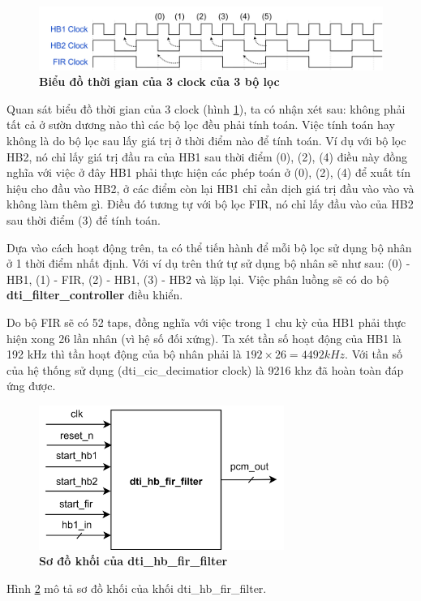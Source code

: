 \begin{figure}[H]
    \centering
    \includegraphics[width=16cm]{Images/Chuong4/hb_fir/timing.png}
    \caption[Biểu đồ thời gian của 3 clock của 3 bộ lọc]{\bfseries \fontsize{12pt}{0pt}\selectfont Biểu đồ thời gian của 3 clock của 3 bộ lọc}
    \label{3clock}
\end{figure}

Quan sát biểu đồ thời gian của 3 clock (hình \ref{3clock}), ta có nhận xét sau: không phải tất cả ở sườn dương nào thì các bộ lọc đều phải tính toán. Việc tính toán hay không là do bộ lọc sau lấy giá trị ở thời điểm nào để tính toán. Ví dụ với bộ lọc HB2, nó chỉ lấy giá trị đầu ra của HB1 sau thời điểm (0), (2), (4) điều này đồng nghĩa với việc ở đây HB1 phải thực hiện các phép toán ở (0), (2), (4) để xuất tín hiệu cho đầu vào HB2, ở các điểm còn lại HB1 chỉ cần dịch giá trị đầu vào vào và không làm thêm gì. Điều đó tương tự với bộ lọc FIR, nó chỉ lấy đầu vào của HB2  sau thời điểm (3) để tính toán.

Dựa vào cách hoạt động trên, ta có thể tiến hành để mỗi bộ lọc sử dụng bộ nhân ở 1 thời điểm nhất định. Với ví dụ trên thứ tự sử dụng bộ nhân sẽ như sau: (0) - HB1, (1) - FIR, (2) - HB1, (3) - HB2 và lặp lại. Việc phân luồng sẽ có do bộ \textbf{dti\_filter\_controller} điều khiển.

Do bộ FIR sẽ có 52 taps, đồng nghĩa với việc trong 1 chu kỳ của HB1 phải thực hiện xong 26 lần nhân (vì hệ số đối xứng). Ta xét tần số hoạt động của HB1 là 192 kHz thì tần hoạt động của bộ nhân phải là $192 \times 26 = 4492 kHz$. Với tần số của hệ thống sử dụng (dti\_cic\_decimatior clock) là 9216 khz đã hoàn toàn đáp ứng được.

\begin{figure}[H]
    \centering
    \includegraphics[width=8cm]{Images/Chuong4/hb_fir/hb_fir_top.png}
    \caption[Sơ đồ khối của dti\_cic\_decimator]{\bfseries \fontsize{12pt}{0pt}\selectfont Sơ đồ khối của dti\_hb\_fir\_filter}
    \label{hb_fir_top}
\end{figure}
Hình \ref{hb_fir_top} mô tả sơ đồ khối của khối dti\_hb\_fir\_filter.

